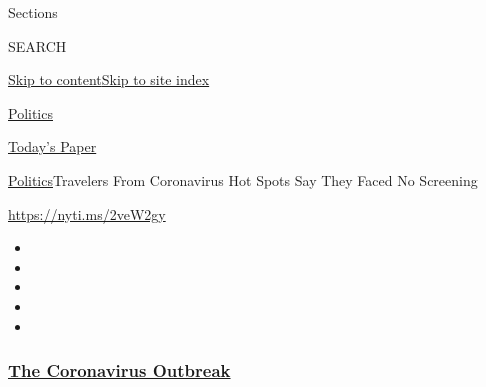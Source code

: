 Sections

SEARCH

\protect\hyperlink{site-content}{Skip to
content}\protect\hyperlink{site-index}{Skip to site index}

\href{https://www.nytimes3xbfgragh.onion/section/politics}{Politics}

\href{https://myaccount.nytimes3xbfgragh.onion/auth/login?response_type=cookie\&client_id=vi}{}

\href{https://www.nytimes3xbfgragh.onion/section/todayspaper}{Today's
Paper}

\href{/section/politics}{Politics}\textbar{}Travelers From Coronavirus
Hot Spots Say They Faced No Screening

\url{https://nyti.ms/2veW2gy}

\begin{itemize}
\item
\item
\item
\item
\item
\end{itemize}

\hypertarget{the-coronavirus-outbreak}{%
\subsubsection{\texorpdfstring{\href{https://www.nytimes3xbfgragh.onion/news-event/coronavirus?name=styln-coronavirus-national\&region=TOP_BANNER\&block=storyline_menu_recirc\&action=click\&pgtype=Article\&impression_id=9c4383f0-f4c0-11ea-bc13-db3a9dba292a\&variant=undefined}{The
Coronavirus
Outbreak}}{The Coronavirus Outbreak}}\label{the-coronavirus-outbreak}}

